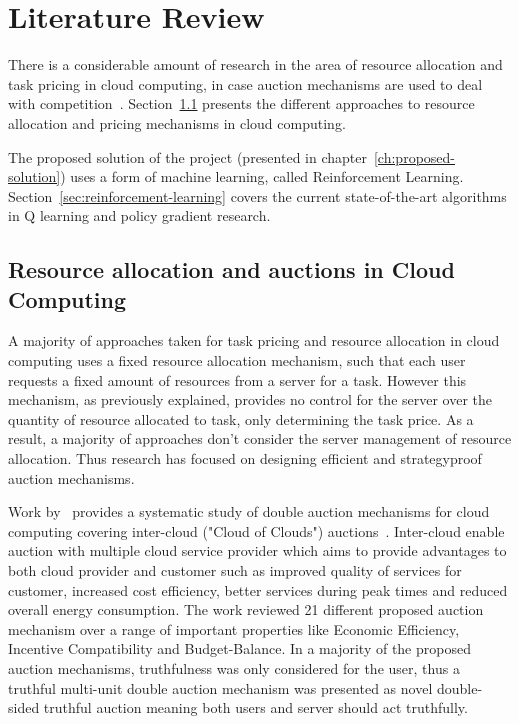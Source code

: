 \chapter{Literature Review}\label{ch:literature-review}
There is a considerable amount of research in the area of resource allocation and task pricing in cloud computing,
in case auction mechanisms are used to deal with competition~\citep{KUMAR2017234,Bi2019}.
Section~\ref{sec:resource-allocation-and-auctions-in-cloud-computing} presents the different approaches to resource
allocation and pricing mechanisms in cloud computing.

The proposed solution of the project (presented in chapter~\ref{ch:proposed-solution}) uses a form of
machine learning, called Reinforcement Learning. Section~\ref{sec:reinforcement-learning} covers the current
state-of-the-art algorithms in Q learning and policy gradient research.

\section{Resource allocation and auctions in Cloud Computing}\label{sec:resource-allocation-and-auctions-in-cloud-computing}
A majority of approaches taken for task pricing and resource allocation in cloud computing uses a fixed resource
allocation mechanism, such that each user requests a fixed amount of resources from a server for a task. However this
mechanism, as previously explained, provides no control for the server over the quantity of resource allocated to task,
only determining the task price. As a result, a majority of approaches don't consider the server management of resource
allocation. Thus research has focused on designing efficient and strategyproof auction mechanisms.

Work by~\cite{KUMAR2017234} provides a systematic study of double auction mechanisms for cloud computing covering
inter-cloud ("Cloud of Clouds") auctions~\citep{interclouds}. Inter-cloud enable auction with multiple cloud service
provider which aims to provide advantages to both cloud provider and customer such as improved quality of services for
customer, increased cost efficiency, better services during peak times and reduced overall energy consumption.
The work reviewed 21 different proposed auction mechanism over a range of important properties like Economic Efficiency,
Incentive Compatibility and Budget-Balance. In a majority of the proposed auction mechanisms, truthfulness was only
considered for the user, thus a truthful multi-unit double auction mechanism was presented as novel double-sided
truthful auction meaning both users and server should act truthfully.

